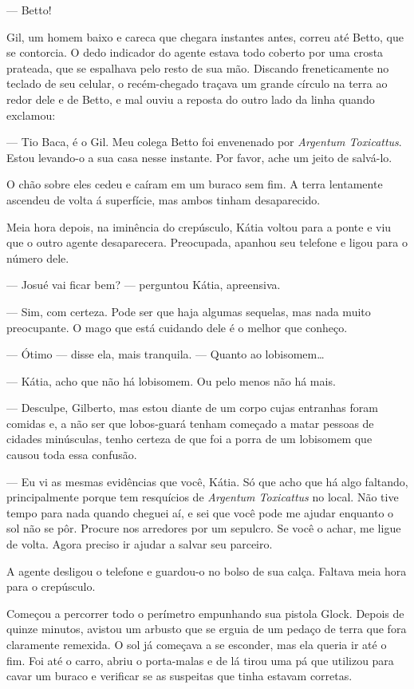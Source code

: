 --- Betto!

Gil, um homem baixo e careca que chegara instantes antes, correu até
Betto, que se contorcia. O dedo indicador do agente estava todo coberto
por uma crosta prateada, que se espalhava pelo resto de sua mão.
Discando freneticamente no teclado de seu celular, o recém-chegado
traçava um grande círculo na terra ao redor dele e de Betto, e mal ouviu
a reposta do outro lado da linha quando exclamou:

--- Tio Baca, é o Gil. Meu colega Betto foi envenenado por
\textit{Argentum Toxicattus}. Estou levando-o a sua casa nesse instante.
Por favor, ache um jeito de salvá-lo.

O chão sobre eles cedeu e caíram em um buraco sem fim. A terra
lentamente ascendeu de volta á superfície, mas ambos tinham
desaparecido.

Meia hora depois, na iminência do crepúsculo, Kátia voltou para a ponte
e viu que o outro agente desaparecera. Preocupada, apanhou seu telefone
e ligou para o número dele.

--- Josué vai ficar bem? --- perguntou Kátia, apreensiva.

--- Sim, com certeza. Pode ser que haja algumas sequelas, mas nada muito
preocupante. O mago que está cuidando dele é o melhor que conheço.

--- Ótimo --- disse ela, mais tranquila. --- Quanto ao lobisomem\ldots

--- Kátia, acho que não há lobisomem. Ou pelo menos não há mais.

--- Desculpe, Gilberto, mas estou diante de um corpo cujas entranhas
foram comidas e, a não ser que lobos-guará tenham começado a matar
pessoas de cidades minúsculas, tenho certeza de que foi a porra de um
lobisomem que causou toda essa confusão.

--- Eu vi as mesmas evidências que você, Kátia. Só que acho que há algo
faltando, principalmente porque tem resquícios de \textit{Argentum
Toxicattus} no local. Não tive tempo para nada quando cheguei aí, e sei
que você pode me ajudar enquanto o sol não se pôr. Procure nos arredores
por um sepulcro. Se você o achar, me ligue de volta. Agora preciso ir
ajudar a salvar seu parceiro.

A agente desligou o telefone e guardou-o no bolso de sua calça. Faltava
meia hora para o crepúsculo.

Começou a percorrer todo o perímetro empunhando sua pistola Glock.
Depois de quinze minutos, avistou um arbusto que se erguia de um pedaço
de terra que fora claramente remexida. O sol já começava a se esconder,
mas ela queria ir até o fim. Foi até o carro, abriu o porta-malas e de
lá tirou uma pá que utilizou para cavar um buraco e verificar se as
suspeitas que tinha estavam corretas.

